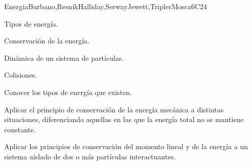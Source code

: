 \begin{syllabus}
\begin{unit}{}{Energía}{Burbano,ResnikHalliday,SerwayJewett,TriplerMosca}{6}{C24}
\begin{topics}
      \item Tipos de energía.
      \item Conservación de la energía. 
      \item Dinámica de un sistema de partículas.
      \item Colisiones.
  \end{topics}

   \begin{learningoutcomes}
      \item Conocer los tipos de energía que existen.
      \item Aplicar el principio de conservación de la energía mecánica a distintas situaciones, diferenciando aquellas en las que la energía total no se mantiene constante. 
      \item Aplicar los principios de conservación del momento lineal y de la energía a un sistema aislado de dos o más partículas interactuantes.
   \end{learningoutcomes}
\end{unit}

\begin{coursebibliography}
\end{coursebibliography}

\end{syllabus}
